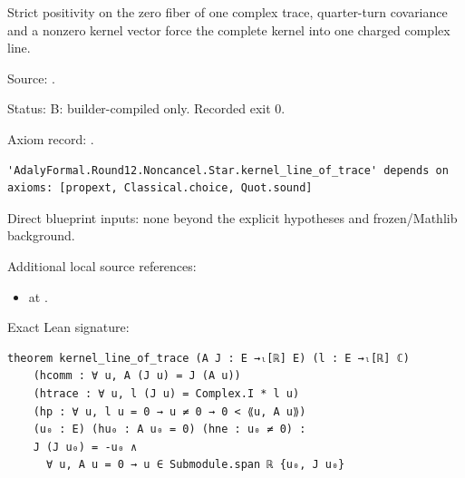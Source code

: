 \begin{theorem}[bp-193]
\label{bp-193}
\uses{}
\leanok
Strict positivity on the zero fiber of one complex trace, quarter-turn covariance and a nonzero kernel vector force the complete kernel into one charged complex line.

\par Source: \texttt{}.
\par Status: B: builder-compiled only. Recorded exit 0.
\par Axiom record: \texttt{}.
\begin{verbatim}
'AdalyFormal.Round12.Noncancel.Star.kernel_line_of_trace' depends on axioms: [propext, Classical.choice, Quot.sound]
\end{verbatim}
\par Direct blueprint inputs: none beyond the explicit hypotheses and frozen/Mathlib background.
\par Additional local source references:
\begin{itemize}
\item \texttt{} at \texttt{}.
\end{itemize}
\par Exact Lean signature:
\begin{verbatim}
theorem kernel_line_of_trace (A J : E →ₗ[ℝ] E) (l : E →ₗ[ℝ] ℂ)
    (hcomm : ∀ u, A (J u) = J (A u))
    (htrace : ∀ u, l (J u) = Complex.I * l u)
    (hp : ∀ u, l u = 0 → u ≠ 0 → 0 < ⟪u, A u⟫)
    (u₀ : E) (hu₀ : A u₀ = 0) (hne : u₀ ≠ 0) :
    J (J u₀) = -u₀ ∧
      ∀ u, A u = 0 → u ∈ Submodule.span ℝ {u₀, J u₀}
\end{verbatim}
\end{theorem}

